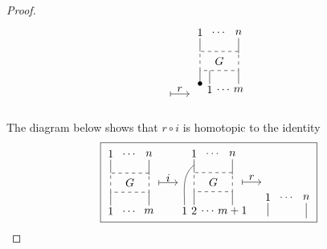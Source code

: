 \begin{proof}
\begin{equation*}
{\begin{tikzpicture}[scale=.6]
		\node at (3,.75) {$r$}; \draw [|->] (2.5,.5) -- (3.5,.5);
		\end{tikzpicture}
		\ %
		\begin{tikzpicture}[scale=.6]
		\node at (0,2) {$1$}; \draw (0,1.7) -- (0,1);
		\node at (1,2) {$\dots$};
		\node at (2,2) {$n$}; \draw (2,1.7) -- (2,.9);
		
		\draw [dashed] (0,0) rectangle (2,1); \node at (1, .5) {$G$};
		
		\node at(0,-.7) {$\bullet$}; \draw (0,-.7) -- (0,0);
		\node at (.5,-1) {$1$}; \draw (.5,-.7) -- (.5,0);
		\node at (1.25,-1) {$\dots$};
		\node at (2,-1) {$m$}; \draw (2,-.7) -- (2,0);
		\end{tikzpicture}}
	\end{equation*}\\
	The diagram below shows that $r\circ i$ is homotopic to the identity\\
	\begin{equation*}
	\boxed{\begin{tikzpicture}[scale=.6]
		\node at (0,2) {$1$}; \draw (0,1.7) -- (0,1);
		\node at (1,2) {$\dots$};
		\node at (2,2) {$n$}; \draw (2,1.7) -- (2,.9);
		
		\draw [dashed] (0,0) rectangle (2,1); \node at (1, .5) {$G$};
		
		\node at (0,-1) {$1$}; \draw (0,-.7) -- (0,0);
		\node at (1,-1) {$\dots$};
		\node at (2,-1) {$m$}; \draw (2,-.7) -- (2,0);
		
		\node at (3,.75) {$i$}; \draw [|->] (2.5,.5) -- (3.5,.5);
		\end{tikzpicture}
		\begin{tikzpicture}[scale=.6]
		\node at (0,2) {$1$}; \draw (0,1.7) -- (0,1);
		\node at (1,2) {$\dots$};
		\node at (2,2) {$n$}; \draw (2,1.7) -- (2,.9);
		
		\draw [dashed] (0,0) rectangle (2,1); \node at (1, .5) {$G$};
		
		\node at (-.5,-1) {$1$}; \draw (-.5,-.7)  to[out=90,in=-140]  (0,1.4);
		\node at (0,-1) {$2$}; \draw (0,-.7) -- (0,0);
		\node at (.75,-1) {$\dots$};
		\node at (2,-1) {$m+1$}; \draw (2,-.7) -- (2,0);
		
		\node at (3,.75) {$r$}; \draw [|->] (2.5,.5) -- (3.5,.5);
		\end{tikzpicture}
		\begin{tikzpicture}[scale=.6]
		\node at (0,2) {$1$}; \draw (0,1.7) -- (0,1);
		\node at (1,2) {$\dots$};
		\node at (2,2) {$n$}; \draw (2,1.7) -- (2,.9);
		

\end{tikzpicture}}
\end{equation*}
\end{proof}
